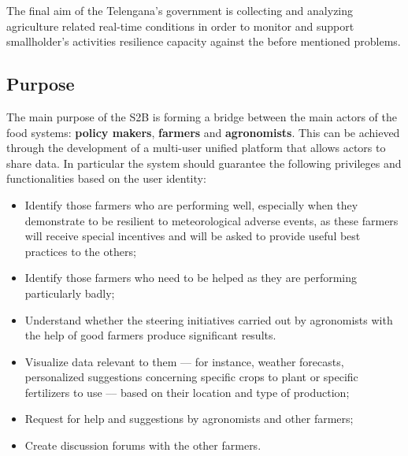 The final aim of the Telengana's government is collecting and analyzing agriculture related real-time conditions in order to monitor and support smallholder's activities resilience capacity against the before mentioned problems.

\subsection{Purpose}
The main purpose of the S2B is forming a bridge between the main actors of the food systems: \textbf{policy makers}, \textbf{farmers} and \textbf{agronomists}. This can be achieved through the development of a multi-user unified platform that allows actors to share data. In particular the system should guarantee the following privileges and functionalities based on the user identity:
\begin{description}[font=~\normalfont\scshape]
    \item[\textbf{\textcolor{myblue}{Policy makers privileges}}]
    \hfill \begin{itemize}[topsep=0pt,leftmargin=0pt]
                \item Identify those farmers who are performing well, especially when they demonstrate to be resilient to meteorological adverse events, as these farmers will receive special incentives and will be asked to provide useful best practices to the others;
                \item Identify those farmers who need to be helped as they are performing particularly badly;
                \item Understand whether the steering initiatives carried out by agronomists with the help of good farmers produce significant results.
            \end{itemize}
    \item[\textbf{\textcolor{myblue}{Farmers privileges}}]
    \hfill \begin{itemize}[topsep=0pt,leftmargin=0pt]
                \item Visualize data relevant to them –-- for instance, weather forecasts, personalized suggestions concerning specific crops to plant or specific fertilizers to use --– based on their location and type of production;
                \item Request for help and suggestions by agronomists and other farmers;
                \item Create discussion forums with the other farmers.

\end{itemize}
\end{description}
